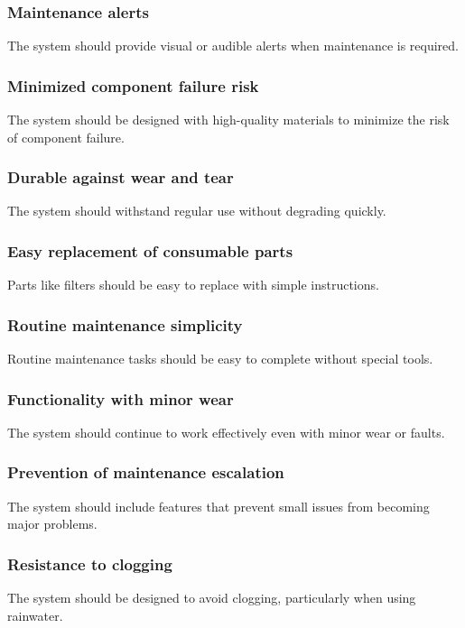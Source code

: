 \documentclass[12pt]{report}
\begin{document}
\subsubsection{Maintenance alerts}
The system should provide visual or audible alerts when maintenance is required.

\subsubsection{Minimized component failure risk}
The system should be designed with high-quality materials to minimize the risk of component failure.

\subsubsection{Durable against wear and tear}
The system should withstand regular use without degrading quickly.

\subsubsection{Easy replacement of consumable parts}
Parts like filters should be easy to replace with simple instructions.

\subsubsection{Routine maintenance simplicity}
Routine maintenance tasks should be easy to complete without special tools.

\subsubsection{Functionality with minor wear}
The system should continue to work effectively even with minor wear or faults.

\subsubsection{Prevention of maintenance escalation}
The system should include features that prevent small issues from becoming major problems.

\subsubsection{Resistance to clogging}
The system should be designed to avoid clogging, particularly when using rainwater.
\end{document}
